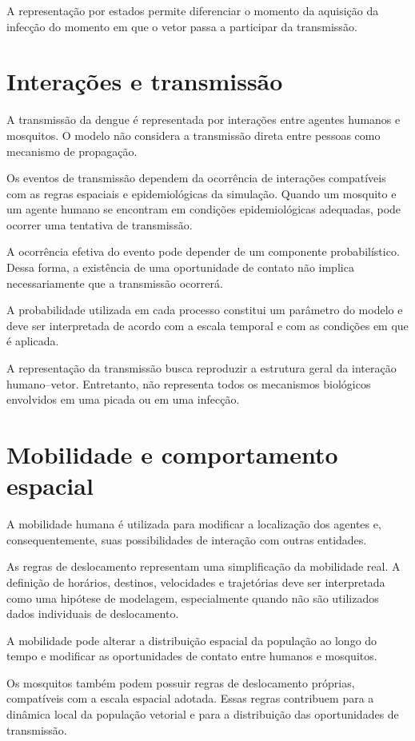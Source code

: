 A representação por estados permite diferenciar o momento da aquisição da infecção do momento em que o vetor passa a participar da transmissão.

\section{Interações e transmissão}

A transmissão da dengue é representada por interações entre agentes humanos e mosquitos. O modelo não considera a transmissão direta entre pessoas como mecanismo de propagação.

Os eventos de transmissão dependem da ocorrência de interações compatíveis com as regras espaciais e epidemiológicas da simulação. Quando um mosquito e um agente humano se encontram em condições epidemiológicas adequadas, pode ocorrer uma tentativa de transmissão.

A ocorrência efetiva do evento pode depender de um componente probabilístico. Dessa forma, a existência de uma oportunidade de contato não implica necessariamente que a transmissão ocorrerá.

A probabilidade utilizada em cada processo constitui um parâmetro do modelo e deve ser interpretada de acordo com a escala temporal e com as condições em que é aplicada.

A representação da transmissão busca reproduzir a estrutura geral da interação humano--vetor. Entretanto, não representa todos os mecanismos biológicos envolvidos em uma picada ou em uma infecção.

\section{Mobilidade e comportamento espacial}

A mobilidade humana é utilizada para modificar a localização dos agentes e, consequentemente, suas possibilidades de interação com outras entidades.

As regras de deslocamento representam uma simplificação da mobilidade real. A definição de horários, destinos, velocidades e trajetórias deve ser interpretada como uma hipótese de modelagem, especialmente quando não são utilizados dados individuais de deslocamento.

A mobilidade pode alterar a distribuição espacial da população ao longo do tempo e modificar as oportunidades de contato entre humanos e mosquitos.

Os mosquitos também podem possuir regras de deslocamento próprias, compatíveis com a escala espacial adotada. Essas regras contribuem para a dinâmica local da população vetorial e para a distribuição das oportunidades de transmissão.

